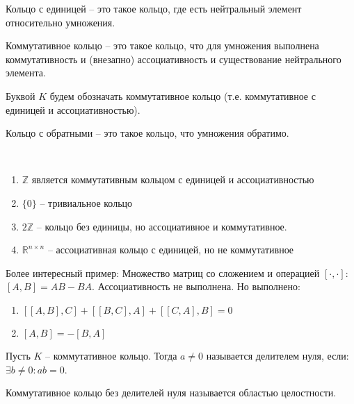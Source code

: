 \documentclass[document.tex]{subfiles}
\begin{document}
\begin{definition}
Кольцо с единицей -- это такое кольцо, где есть нейтральный элемент относительно умножения.
\end{definition}

\begin{definition}
Коммутативное кольцо -- это такое кольцо, что для умножения выполнена коммутативность и (внезапно) ассоциативность и существование нейтрального элемента.
\end{definition}

\begin{remark}
Буквой $K$ будем обозначать коммутативное кольцо (т.е. коммутативное с единицей и ассоциативностью).
\end{remark}

\begin{definition}
Кольцо с обратными -- это такое кольцо, что умножения обратимо.
\end{definition}

\begin{example}
~\begin{enumerate}
\item $\mathbb{Z}$ является коммутативным кольцом с единицей и ассоциативностью
\item $\{0\}$ -- тривиальное кольцо
\item $2\mathbb{Z}$ -- кольцо без единицы, но ассоциативное и коммутативное.
\item $\mathbb{R}^{n \times n}$ -- ассоциативная кольцо с единицей, но не коммутативное
\end{enumerate}
\begin{example}
Более интересный пример:
Множество матриц со сложением и операцией $[\cdot, \cdot]$:
$[A, B] = AB - BA$.
Ассоциативность не выполнена. Но выполнено:
\begin{enumerate}
\item $[[A, B], C] + [[B, C], A] + [[C, A], B] = 0$
\item $[A, B] = -[B, A]$
\end{enumerate}
\end{example}
\end{example}

\begin{definition}
Пусть $K$ -- коммутативное кольцо. Тогда $a \neq 0$ называется делителем нуля, если:
$\exists b \neq 0 : ab = 0$.
\end{definition}

\begin{definition}
Коммутативное кольцо без делителей нуля называется областью целостности.
\end{definition}
\end{document}
